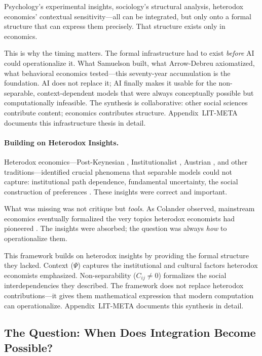 Psychology's experimental insights, sociology's structural analysis, heterodox economics' contextual sensitivity---all can be integrated, but only onto a formal structure that can express them precisely. That structure exists only in economics.

This is why the timing matters. The formal infrastructure had to exist \emph{before} AI could operationalize it. What Samuelson built, what Arrow-Debreu axiomatized, what behavioral economics tested---this seventy-year accumulation is the foundation. AI does not replace it; AI finally makes it usable for the non-separable, context-dependent models that were always conceptually possible but computationally infeasible. The synthesis is collaborative: other social sciences contribute content; economics contributes structure. Appendix~LIT-META documents this infrastructure thesis in detail.

\paragraph{Building on Heterodox Insights.}
Heterodox economics---Post-Keynesian \citep{lavoie2014post}, Institutionalist \citep{hodgson2004evolution}, Austrian \citep{hayek1945knowledge}, and other traditions---identified crucial phenomena that separable models could not capture: institutional path dependence, fundamental uncertainty, the social construction of preferences \citep{lawson2006nature,davis2008heterodox}. These insights were correct and important.

What was missing was not critique but \emph{tools}. As Colander observed, mainstream economics eventually formalized the very topics heterodox economists had pioneered \citep{colander2004changing}. The insights were absorbed; the question was always \emph{how} to operationalize them.

This framework builds on heterodox insights by providing the formal structure they lacked. Context ($\Psi$) captures the institutional and cultural factors heterodox economists emphasized. Non-separability ($C_{ij} \neq 0$) formalizes the social interdependencies they described. The framework does not replace heterodox contributions---it gives them mathematical expression that modern computation can operationalize. Appendix~LIT-META documents this synthesis in detail.

\subsection{The Question: When Does Integration Become Possible?}
\label{sec:intro-question}

